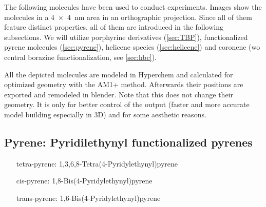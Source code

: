 \label{chapter:used-molecules}
The following molecules have been used to conduct experiments. Images show the molecules in a \SI{4x4}{\nano \meter} area in an orthographic projection. Since all of them feature distinct properties, all of them are introduced in the following subsections. We will utilize porphyrine derivatives (\autoref{sec:TBP}), functionalized pyrene molecules (\autoref{sec:pyrene}), helicene species (\autoref{sec:helicene}) and coronene (w\/o central borazine functionalization, see \autoref{sec:hbc}).

All the depicted molecules are modeled in Hyperchem\cite{_hyperchemtm_1111} and calculated for optimized geometry with the AM1+ method. Afterwards their positions are exported and remodeled in blender. Note that this does not change their geometry. It is only for better control of the output (faster and more accurate model building especially in 3D) and for some aesthetic reasons.

\subsection{Pyrene: Pyridilethynyl functionalized pyrenes}
\label{sec:pyrene}
\begin{itemize}
	\item[tetra-pyrene:] 1,3,6,8-Tetra(4-Pyridylethynyl)pyrene
	\item[cis-pyrene:] 1,8-Bis(4-Pyridylethynyl)pyrene
	\item[trans-pyrene:] 1,6-Bis(4-Pyridylethynyl)pyrene
\end{itemize}

